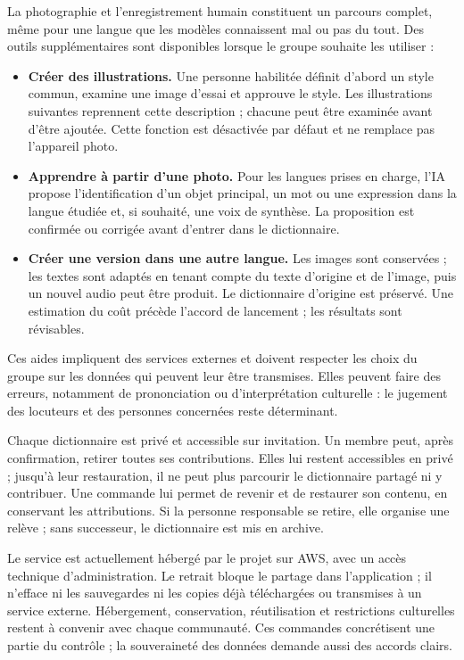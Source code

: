 \documentclass[11pt,a4paper]{article}
\newcommand{\rubrique}[1]{\vspace{5pt}{\large\bfseries\textcolor{accent}{#1}\par}\vspace{2pt}}
\begin{document}
\rubrique{Des aides par IA, lorsqu'elles sont souhaitées}
La photographie et l'enregistrement humain constituent un parcours complet, même
pour une langue que les modèles connaissent mal ou pas du tout. Des outils
supplémentaires sont disponibles lorsque le groupe souhaite les utiliser :
\begin{itemize}
\item \textbf{Créer des illustrations.} Une personne habilitée définit d'abord un
style commun, examine une image d'essai et approuve le style. Les illustrations
suivantes reprennent cette description ; chacune peut être examinée avant d'être
ajoutée. Cette fonction est désactivée par défaut et ne remplace pas l'appareil photo.
\item \textbf{Apprendre à partir d'une photo.} Pour les langues prises en charge,
l'IA propose l'identification d'un objet principal, un mot ou une expression dans
la langue étudiée et, si souhaité, une voix de synthèse. La proposition est
confirmée ou corrigée avant d'entrer dans le dictionnaire.
\item \textbf{Créer une version dans une autre langue.} Les images sont conservées ;
les textes sont adaptés en tenant compte du texte d'origine et de l'image, puis
un nouvel audio peut être produit. Le dictionnaire d'origine est préservé. Une
estimation du coût précède l'accord de lancement ; les résultats sont révisables.
\end{itemize}
Ces aides impliquent des services externes et doivent respecter les choix du groupe
sur les données qui peuvent leur être transmises. Elles peuvent faire des erreurs,
notamment de prononciation ou d'interprétation culturelle : le jugement des
locuteurs et des personnes concernées reste déterminant.

\rubrique{Garder la maîtrise de ses contributions}
Chaque dictionnaire est privé et accessible sur invitation. Un membre peut, après
confirmation, retirer toutes ses contributions. Elles lui restent accessibles en
privé ; jusqu'à leur restauration, il ne peut plus parcourir le dictionnaire
partagé ni y contribuer. Une commande lui permet de revenir et de restaurer son
contenu, en conservant les attributions. Si la personne responsable se retire,
elle organise une relève ; sans successeur, le dictionnaire est mis en archive.

Le service est actuellement hébergé par le projet sur AWS, avec un accès technique
d'administration. Le retrait bloque le partage dans l'application ; il n'efface
ni les sauvegardes ni les copies déjà téléchargées ou transmises à un service
externe. Hébergement, conservation, réutilisation et restrictions culturelles
restent à convenir avec chaque communauté. Ces commandes concrétisent une partie
du contrôle ; la souveraineté des données demande aussi des accords clairs.
\end{document}
